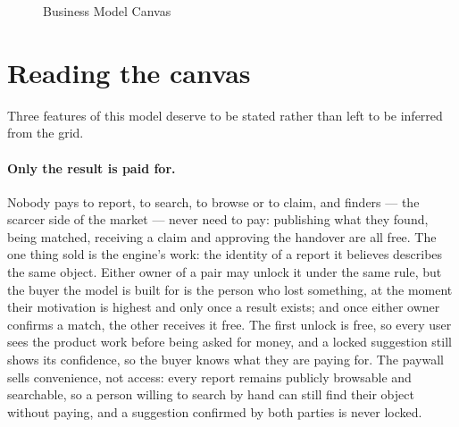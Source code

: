 \begin{figure}[htbp]
\caption{Business Model Canvas}
\label{fig:canvas}
\end{figure}

\section{Reading the canvas}

Three features of this model deserve to be stated rather than left to be
inferred from the grid.

\paragraph{Only the result is paid for.} Nobody pays to report, to search, to
browse or to claim, and finders --- the scarcer side of the market --- never
need to pay: publishing what they found, being matched, receiving a claim and
approving the handover are all free. The one thing sold is the engine's work:
the identity of a report it believes describes the same object. Either owner of
a pair may unlock it under the same rule, but the buyer the model is built for
is the person who lost something, at the moment their motivation is highest and
only once a result exists; and once either owner confirms a match, the other
receives it free. The
first unlock is free, so every user sees the product work before being asked
for money, and a locked suggestion still shows its confidence, so the buyer
knows what they are paying for. The paywall sells convenience, not access: every
report remains publicly browsable and searchable, so a person willing to search
by hand can still find their object without paying, and a suggestion confirmed
by both parties is never locked.

